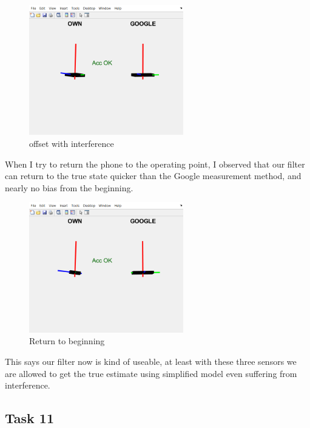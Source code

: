 \begin{figure}[H]
 \centering
 \includegraphics[width=0.6\textwidth]{images/biasmag.png}
 \caption{offset with interference }
 \label{offsetmag}
\end{figure}

When I try to return the phone to the operating point, I observed that our filter can return to the true state quicker than the Google measurement method, and nearly no bias from the beginning.

\begin{figure}[H]
 \centering
 \includegraphics[width=0.6\textwidth]{images/returnmag.png}
 \caption{Return to beginning}
 \label{return}
\end{figure}

This says our filter now is kind of useable, at least with these three sensors we are allowed to get the true estimate using simplified model even suffering from interference.

\subsection{Task 11}

